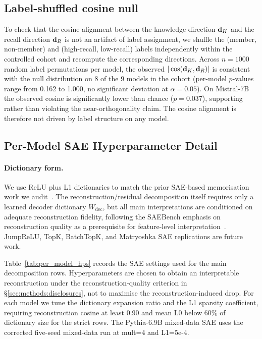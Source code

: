 \subsection{Label-shuffled cosine null}
\label{app:label_shuffled_null}

To check that the cosine alignment between the knowledge direction $\mathbf{d}_K$ and the recall direction $\mathbf{d}_R$ is not an artifact of label assignment, we shuffle the (member, non-member) and (high-recall, low-recall) labels independently within the controlled cohort and recompute the corresponding directions. Across $n=1000$ random label permutations per model, the observed $|\cos(\mathbf{d}_K, \mathbf{d}_R)|$ is consistent with the null distribution on 8 of the 9 models in the cohort (per-model $p$-values range from 0.162 to 1.000, no significant deviation at $\alpha=0.05$). On Mistral-7B the observed cosine is significantly lower than chance ($p=0.037$), supporting rather than violating the near-orthogonality claim. The cosine alignment is therefore not driven by label structure on any model.

\subsection{Per-Model SAE Hyperparameter Detail}
\label{app:per_model_hps_detail}

\paragraph{Dictionary form.}
We use ReLU plus L1 dictionaries to match the prior SAE-based memorisation work we audit~\citep{wang2025sspu,frikha2025privacyscalpel,muhamed2025dsg,suri2025mitigating}. The reconstruction/residual decomposition itself requires only a learned decoder dictionary $W_{\mathrm{dec}}$, but all main interpretations are conditioned on adequate reconstruction fidelity, following the SAEBench emphasis on reconstruction quality as a prerequisite for feature-level interpretation~\citep{karvonen2025saebench}. JumpReLU, TopK, BatchTopK, and Matryoshka SAE replications are future work.

Table~\ref{tab:per_model_hps} records the SAE settings used for the main decomposition rows. Hyperparameters are chosen to obtain an interpretable reconstruction under the reconstruction-quality criterion in \S\ref{sec:methods:disclosures}, not to maximise the reconstruction-induced drop. For each model we tune the dictionary expansion ratio and the L1 sparsity coefficient, requiring reconstruction cosine at least 0.90 and mean L0 below 60\% of dictionary size for the strict rows. The Pythia-6.9B mixed-data SAE uses the corrected five-seed mixed-data run at mult=4 and L1=5e-4.

